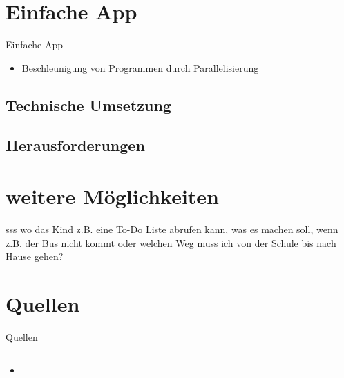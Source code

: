 \documentclass[10pt,fleqn]{beamer}
\begin{document}
\section{Einfache App}
\begin{frame}[t]{Einfache App}
\begin{itemize}
	\item Beschleunigung von Programmen durch Parallelisierung
\end{itemize}
\end{frame}

\subsection{Technische Umsetzung}

\subsection{Herausforderungen}

\section{weitere Möglichkeiten}
	\begin{frame}[t]{sss}
	wo das Kind z.B. eine To-Do Liste abrufen kann, was es machen soll,
	wenn z.B. der Bus nicht kommt oder welchen Weg muss ich von der Schule bis nach
	Hause gehen?
	\end{frame}


\section{Quellen}
\begin{frame}{Quellen}
	\begin{columns}
		\begin{column}{16cm}	
			\begin{itemize}
				\item 
			\end{itemize}
		\end{column}
	\end{columns}
\end{frame}
\end{document}
